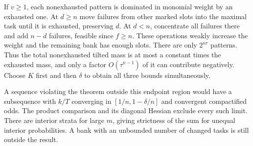 If $v\ge1$, each nonexhausted pattern is dominated in monomial weight by an exhausted one. At $d\ge n$ move failures from other marked slots into the maximal task until it is exhausted, preserving $d$. At $d<n$, concentrate all failures there and add $n-d$ failures, feasible since $f\ge n$. These operations weakly increase the weight and the remaining bank has enough slots. There are only $2^{nr}$ patterns. Thus the total nonexhausted tilted mass is at most a constant times the exhausted mass, and only a factor $O(\tau^{n-1})$ of it can contribute negatively. Choose $K$ first and then $\delta$ to obtain all three bounds simultaneously.

A sequence violating the theorem outside this endpoint region would have a subsequence with $k/T$ converging in $[1/n,1-\delta/n]$ and convergent compactified odds. The product comparison and its diagonal Hessian exclude every such limit. There are interior strata for large $m$, giving strictness of the sum for unequal interior probabilities. A bank with an unbounded number of changed tasks is still outside the result.
